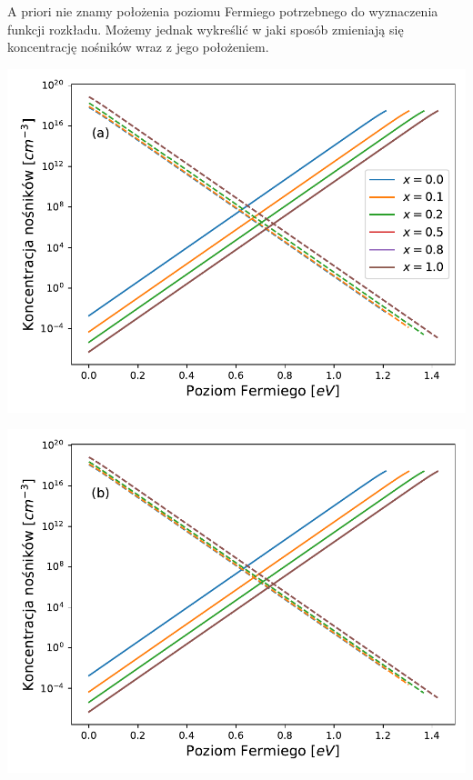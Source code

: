 \documentclass[12pt,openany,a4paper]{book}
\begin{document}
A priori nie znamy położenia poziomu Fermiego potrzebnego do wyznaczenia funkcji rozkładu.
Możemy jednak wykreślić w jaki sposób zmieniają się koncentrację nośników wraz z jego położeniem.


\begin{minipage}[t]{0.5\textwidth}
	\hspace{-0.54cm}
	\includegraphics[width = \linewidth]{Figures/carriers/concentration_L_100.pdf}
\end{minipage}
\begin{minipage}[t]{0.5\textwidth}
	\hspace{-0.54cm}
	\includegraphics[width = 1.0\linewidth]{Figures/carriers/concentration_L_200.pdf}
\end{minipage}
\end{document}
